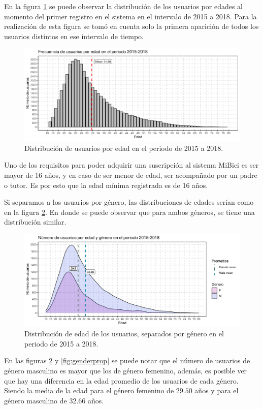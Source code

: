 En la figura \ref{fig:agedistribution} se puede observar la distribución de los usuarios por edades al momento del primer registro en el sistema en el intervalo de 2015 a 2018. Para la realización de esta figura se tomó en cuenta solo la primera aparición de todos los usuarios distintos en ese intervalo de tiempo.

\begin{figure}[H]
	\centering
	\includegraphics[width=14cm]{Graphics/age_distribution}
	\caption{Distribución de usuarios por edad en el periodo de 2015 a 2018.}
	\label{fig:agedistribution}
\end{figure}

Uno de los requisitos para poder adquirir una suscripción al sistema MiBici es ser mayor de 16 años, y en caso de ser menor de edad, ser acompañado por un padre o tutor. Es por esto que la edad mínima registrada es de 16 años.
\par Si separamos a los usuarios por género, las distribuciones de edades serían como en la figura \ref{fig:agegenderdistribution}. En donde se puede observar que para ambos géneros, se tiene una distribución similar.

\begin{figure}[H]
	\centering
	\includegraphics[width=14cm]{Graphics/age_gender_distribution}
	\caption{Distribución de edad de los usuarios, separados por género en el periodo de 2015 a 2018.}
	\label{fig:agegenderdistribution}
\end{figure}

En las figuras \ref{fig:agegenderdistribution} y \ref{fig:genderprop} se puede notar que el número de usuarios de género masculino es mayor que los de género femenino, además, es posible ver que hay una diferencia en la edad promedio de los usuarios de cada género. Siendo la media de la edad para el género femenino de $29.50$ años y para el género masculino de $32.66$ años.